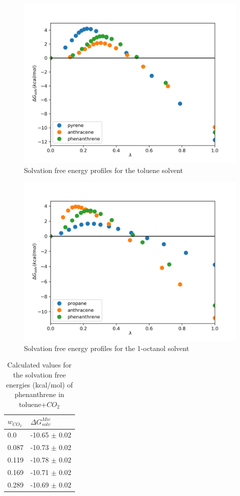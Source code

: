 \begin{figure}
	\centering
    \includegraphics[width=0.9\linewidth]{Figures/tol}
    \caption{Solvation free energy profiles for the toluene solvent }
    \label{fig:tol}
\end{figure}

\begin{figure}
\centering
\includegraphics[width=0.9\linewidth]{Figures/oct}
\caption{Solvation free energy profiles for the 1-octanol solvent}
\label{fig:oct}
\end{figure}

\FloatBarrier
\begin{table}[H]
\centering
  \caption{Calculated values for the solvation free energies (kcal/mol) of phenanthrene in toluene+$CO_{2}$}
  \label{tbl:solv3}
  \begin{tabular}{ll}
    \hline
      $w_{CO_{2}}$ & $\Delta G_{solv}^{Mie}$ \\
    \hline
    0.0    & -10.65 $\pm$ 0.02   \\
    0.087  & -10.73 $\pm$ 0.02   \\
    0.119  & -10.78 $\pm$ 0.02   \\
    0.169  & -10.71 $\pm$ 0.02   \\
    0.289  & -10.69 $\pm$ 0.02   \\
    \hline
  \end{tabular}
\end{table}
\FloatBarrier

